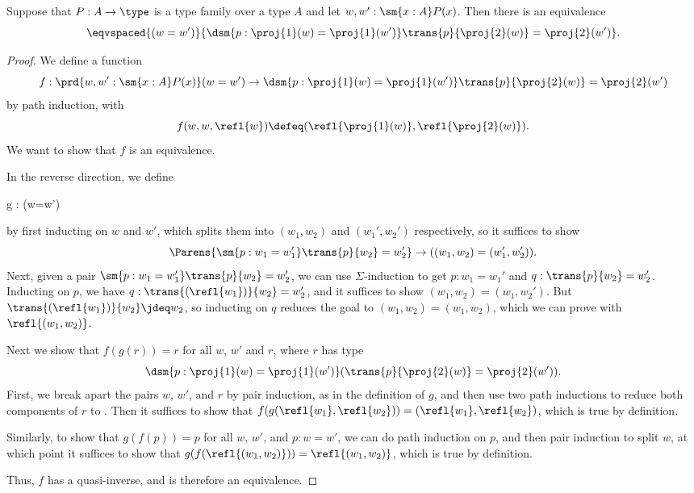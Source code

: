 \begin{thm}\label{thm:path-sigma}
Suppose that $P:A\to\type$ is a type family over a type $A$ and let $w,w':\sm{x:A}P(x)$. Then there is an equivalence
\begin{equation*}
\eqvspaced{(w=w')}{\dsm{p:\proj{1}(w)=\proj{1}(w')} \trans{p}{\proj{2}(w)}=\proj{2}(w')}.
\end{equation*}
\end{thm}

\begin{proof}
We define a function
\begin{equation*}
f : \prd{w,w':\sm{x:A}P(x)} (w=w') \to \dsm{p:\proj{1}(w)=\proj{1}(w')} \trans{p}{\proj{2}(w)}=\proj{2}(w')
\end{equation*}
by path induction, with
\begin{equation*}
f(w,w,\refl{w})\defeq(\refl{\proj{1}(w)},\refl{\proj{2}(w)}).
\end{equation*}
We want to show that $f$ is an equivalence.

In the reverse direction, we define
\begin{narrowmultline*}
  g : 
      \to
      \narrowbreak
      (w=w')
\end{narrowmultline*}
by first inducting on $w$ and $w'$, which splits them into $(w_1,w_2)$ and
$(w_1',w_2')$ respectively, so it suffices to show
\begin{equation*}
\Parens{\sm{p:w_1 = w_1'}\trans{p}{w_2}=w_2'} \to ((w_1,w_2)=(w_1',w_2')).
\end{equation*}
Next, given a pair $\sm{p:w_1 = w_1'}\trans{p}{w_2}=w_2'$, we can
use $\Sigma$-induction to get $p : w_1 = w_1'$ and $q :
\trans{p}{w_2}=w_2'$.  Inducting on $p$, we have $q :
\trans{(\refl{w_1})}{w_2}=w_2'$, and it suffices to show
$(w_1,w_2)=(w_1,w_2')$.  But $\trans{(\refl{w_1})}{w_2} \jdeq w_2$, so
inducting on $q$ reduces the goal to
$(w_1,w_2)=(w_1,w_2)$, which we can prove with $\refl{(w_1,w_2)}$.

Next we show that $f(g(r))=r$ for all $w$, $w'$ and
$r$, where $r$ has type
\[\dsm{p:\proj{1}(w)=\proj{1}(w')} (\trans{p}{\proj{2}(w)}=\proj{2}(w')).\]
First, we break apart the pairs $w$, $w'$, and $r$ by pair induction, as in the
definition of $g$, and then use two path inductions to reduce both components
of $r$ to .  Then it suffices to show that
$f (g(\refl{w_1},\refl{w_2})) = (\refl{w_1},\refl{w_2})$, which is true by definition.

Similarly, to show that $g(f(p))=p$ for all $w$, $w'$,
and $p : w = w'$, we can do path induction on $p$, and then pair induction to
split $w$, at which point it suffices to show that
$g(f (\refl{(w_1,w_2)})) = \refl{(w_1,w_2)}$, which is true by
definition.

Thus, $f$ has a quasi-inverse, and is therefore an equivalence.
\end{proof}

